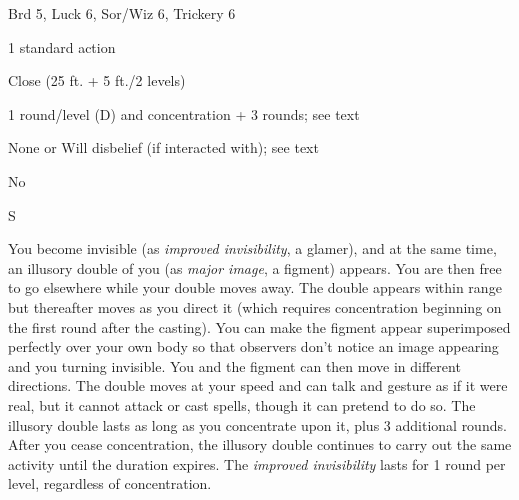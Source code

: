 
\begin{description*}
\item[Level:] Brd 5, Luck 6, Sor/Wiz 6, Trickery 6
\item[Casting Time:] 1 standard action
\item[Range:] Close (25 ft. + 5 ft./2 levels)
\item[Duration:] 1 round/level (D) and concentration + 3 rounds; see text
\item[Saving Throw:] None or Will disbelief (if interacted with); see text
\item[Spell Resistance:] No
\item[Components:] S
\end{description*}

You become invisible (as \textit{improved invisibility}, a glamer), and at the
same time, an illusory double of you (as \textit{major image}, a figment) appears.
You are then free to go elsewhere while your double moves away. The double appears
within range but thereafter moves as you direct it (which requires concentration
beginning on the first round after the casting). You can make the figment appear
superimposed perfectly over your own body so that observers don't notice an image
appearing and you turning invisible. You and the figment can then move in different
directions. The double moves at your speed and can talk and gesture as if it were
real, but it cannot attack or cast spells, though it can pretend to do so.
The illusory double lasts as long as you concentrate upon it, plus 3 additional
rounds. After you cease concentration, the illusory double continues to carry out
the same activity until the duration expires. The \textit{improved invisibility
}lasts for 1 round per level, regardless of concentration.